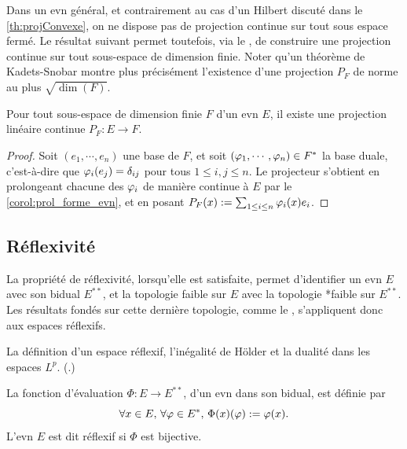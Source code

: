 Dans un evn général, et contrairement au cas d'un Hilbert discuté dans le \cref{th:projConvexe}, on ne dispose pas de projection continue sur tout sous espace fermé. %
Le résultat suivant permet toutefois, via le , de construire une projection continue sur tout sous-espace de dimension finie. Noter qu'un théorème de Kadets-Snobar montre plus précisément l'existence d'une projection $P_F$ de norme au plus $\sqrt{\dim(F)}$. 

\begin{corollary}
\label{corol:projDimFinie}
%
Pour tout sous-espace de dimension finie $F$ d'un evn $E$, il existe une projection linéaire continue $P_F : E \to F$. 
\end{corollary}

\begin{proof}
	Soit $(e_1,\cdots,e_n)$ une base de $F$, et soit $(\varphi_1,\cdots,\varphi_n) \in F^*$ la base duale, c'est-à-dire que $\varphi_i(e_j) = \delta_{ij}$ pour tous $1 \leq i,j \leq n$. Le projecteur s'obtient en prolongeant chacune des $\varphi_i$ de manière continue à $E$ par le \cref{corol:prol_forme_evn}, et en posant $P_F(x) := \sum_{1 \leq i \leq n} \varphi_i(x) e_i$. 
\end{proof}

\subsection{Réflexivité}
\label{subsec:reflexivite}

La propriété de réflexivité, lorsqu'elle est satisfaite, permet d'identifier un evn $E$ avec son bidual $E^{**}$, et la topologie faible sur $E$ avec la topologie *faible sur $E^{**}$. Les résultats fondés sur cette dernière topologie, comme le , s'appliquent donc aux espaces réflexifs.

\begin{retenir}
La définition d'un espace réflexif, l'inégalité de Hölder et la dualité dans les espaces $L^p$.
(.)	
\end{retenir}


\begin{definition}[Réflexivité]
\label{def:reflexif}
%
	La fonction d'évaluation $\Phi : E \to E^{**}$, d'un evn dans son bidual, est définie par
	\begin{equation*}
			\forall x \in E,\, \forall \varphi \in E^*,\,  \Phi(x)(\varphi) := \varphi(x).
	\end{equation*}
	L'evn $E$ est dit réflexif si $\Phi$ est bijective.
\end{definition}


